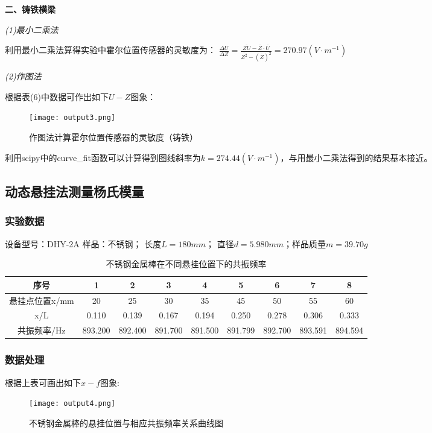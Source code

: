 \documentclass[UTF-8,twoside,cs4size]{ctexart}
\begin{document}
    \textbf{二、铸铁横梁}
    
    \textit{(1)最小二乘法}
    
        利用最小二乘法算得实验中霍尔位置传感器的灵敏度为：
        $\frac{{\Delta U}}{{\Delta Z}} = \frac{{\overline {ZU}  - \overline Z  \cdot \overline U }}{{\overline {{Z^2}}  - {{\left( {\overline Z } \right)}^2}}} = 270.97 \left( {V \cdot {m^{ - 1}}} \right)$\par
        
    \textit{(2)作图法}
        
        根据表(6)中数据可作出如下$ U-Z $图象：
        \begin{figure}[!h]
            \centering
            \texttt{[image: output3.png]}
            \caption{作图法计算霍尔位置传感器的灵敏度（铸铁）}
        \end{figure}
        利用scipy中的curve_fit函数可以计算得到图线斜率为$ k=274.44(V\cdot m^{-1}) $，与用最小二乘法得到的结果基本接近。


\subsection{动态悬挂法测量杨氏模量}
\subsubsection{实验数据}
设备型号：DHY-2A
样品：不锈钢； 长度$L=180mm$； 直径$d=5.980mm$；样品质量$m=39.70g$
\begin{table}[!h]
    \centering
    \caption{不锈钢金属棒在不同悬挂位置下的共振频率}
    \begin{tabular}{c|c|c|c|c|c|c|c|c|}
        \hline
        序号&1&2&3&4&5&6&7&8\\\hline
        悬挂点位置x/mm&20&25&30&35&45&50&55&60\\\hline
        x/L&0.110&0.139&0.167&0.194&0.250&0.278&0.306&0.333\\\hline
        共振频率/Hz&893.200&892.400&891.700&891.500&891.799&892.700&893.591&894.594\\\hline
    \end{tabular}
\end{table}

\subsubsection{数据处理}
根据上表可画出如下$ x-f $图象:
\begin{figure}[!h]
    \centering
    \texttt{[image: output4.png]}
    \caption{不锈钢金属棒的悬挂位置与相应共振频率关系曲线图}
\end{figure}
\end{document}
